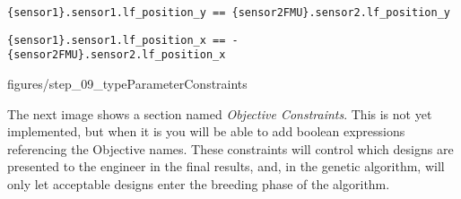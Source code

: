 \documentclass[11pt,a4paper]{../tutorial}
\begin{document}
{{\small 
\verb|{sensor1}.sensor1.lf_position_y == {sensor2FMU}.sensor2.lf_position_y|

\verb|{sensor1}.sensor1.lf_position_x == - {sensor2FMU}.sensor2.lf_position_x|
}

\begin{center}\begin{annotation}[width=0.7\linewidth,trim=0 0 0 0,clip]{figures/step_09_typeParameterConstraints}
    \end{annotation}\end{center}














\newpage

The next image shows a section named \emph{Objective Constraints}.  This is not yet implemented, but when it is you will be able to add boolean expressions referencing the Objective names.  These constraints will control which designs are presented to the engineer in the final results, and, in the genetic algorithm, will only let acceptable designs enter the breeding phase of the algorithm.

}
\end{document}
